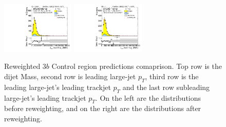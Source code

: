 \begin{figure}[htbp!]
\begin{center}
\includegraphics[width=0.31\textwidth,angle=-90]{figures/boosted/Prereweight/Moriond_ThreeTag_Control_sublHCand_trk0_Pt.pdf}
\includegraphics[width=0.31\textwidth,angle=-90]{figures/boosted/Control/b77_ThreeTag_Control_sublHCand_trk0_Pt.pdf}\\
\caption{Reweighted $3b$ Control region predictions comaprison. Top row is the dijet Mass, second row is leading large-\R jet $p_{T}$, third row is the leading large-\R jet's leading trackjet $p_T$ and the last row subleading large-\R jet's leading trackjet $p_T$. On the left are the distributions before reweighting, and on the right are the distributions after reweighting.}
\label{fig:rw-3b-comp-cr}
\end{center}
\end{figure}


